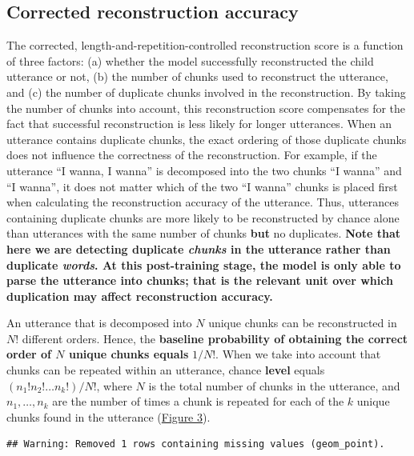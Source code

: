 \documentclass[man,mask,floatsintext]{apa6}
\begin{document}
\subsection{Corrected reconstruction
accuracy}\label{corrected-reconstruction-accuracy}

The corrected, length-and-repetition-controlled reconstruction score is
a function of three factors: (a) whether the model successfully
reconstructed the child utterance or not, (b) the number of chunks used
to reconstruct the utterance, and (c) the number of duplicate chunks
involved in the reconstruction. By taking the number of chunks into
account, this reconstruction score compensates for the fact that
successful reconstruction is less likely for longer utterances. When an
utterance contains duplicate chunks, the exact ordering of those
duplicate chunks does not influence the correctness of the
reconstruction. For example, if the utterance \enquote{I wanna, I wanna}
is decomposed into the two chunks \enquote{I wanna} and \enquote{I
wanna}, it does not matter which of the two \enquote{I wanna} chunks is
placed first when calculating the reconstruction accuracy of the
utterance. Thus, utterances containing duplicate chunks are more likely
to be reconstructed by chance alone than utterances with the same number
of chunks \textbf{but} no duplicates. \textbf{Note that here we are
detecting duplicate \emph{chunks} in the utterance rather than duplicate
\emph{words}. At this post-training stage, the model is only able to
parse the utterance into chunks; that is the relevant unit over which
duplication may affect reconstruction accuracy.}

An utterance that is decomposed into \(N\) unique chunks can be
reconstructed in \(N!\) different orders. Hence, the \textbf{baseline
probability of obtaining the correct order of \(N\) unique chunks
equals} \(1/N!\). When we take into account that chunks can be repeated
within an utterance, chance \textbf{level} equals
\((n_1!n_2!\ldots n_k!)/N!\), where \(N\) is the total number of chunks
in the utterance, and \(n_1,\ldots,n_k\) are the number of times a chunk
is repeated for each of the \(k\) unique chunks found in the utterance
(\protect\hyperlink{fig3}{Figure 3}).

\begin{verbatim}
## Warning: Removed 1 rows containing missing values (geom_point).
\end{verbatim}
\end{document}
